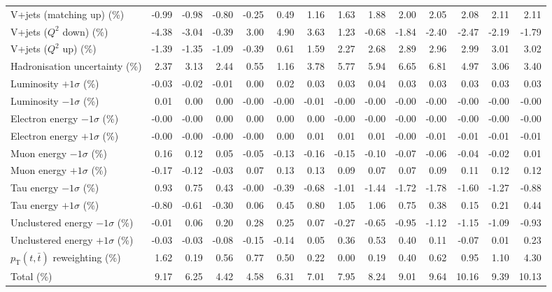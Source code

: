 \begin{table}[htbp]
{\begin{tabular}{lrrrrrrrrrrrrr}
V+jets (matching up) (\%) & -0.99 & -0.98 & -0.80 & -0.25 & 0.49 & 1.16 & 1.63 & 1.88 & 2.00 & 2.05 & 2.08 & 2.11 & 2.11 \\ 
V+jets ($Q^{2}$ down) (\%) & -4.38 & -3.04 & -0.39 & 3.00 & 4.90 & 3.63 & 1.23 & -0.68 & -1.84 & -2.40 & -2.47 & -2.19 & -1.79 \\ 
V+jets ($Q^{2}$ up) (\%) & -1.39 & -1.35 & -1.09 & -0.39 & 0.61 & 1.59 & 2.27 & 2.68 & 2.89 & 2.96 & 2.99 & 3.01 & 3.02 \\ 
Hadronisation uncertainty (\%) & 2.37 & 3.13 & 2.44 & 0.55 & 1.16 & 3.78 & 5.77 & 5.94 & 6.65 & 6.81 & 4.97 & 3.06 & 3.40 \\ 
Luminosity $+1\sigma$ (\%) & -0.03 & -0.02 & -0.01 & 0.00 & 0.02 & 0.03 & 0.03 & 0.04 & 0.03 & 0.03 & 0.03 & 0.03 & 0.03 \\ 
Luminosity $-1\sigma$ (\%) & 0.01 & 0.00 & 0.00 & -0.00 & -0.00 & -0.01 & -0.00 & -0.00 & -0.00 & -0.00 & -0.00 & -0.00 & -0.00 \\ 
Electron energy $-1\sigma$ (\%) & -0.00 & -0.00 & 0.00 & 0.00 & 0.00 & 0.00 & -0.00 & -0.00 & -0.00 & -0.00 & -0.00 & -0.00 & -0.00 \\ 
Electron energy $+1\sigma$ (\%) & -0.00 & -0.00 & -0.00 & -0.00 & 0.00 & 0.01 & 0.01 & 0.01 & -0.00 & -0.01 & -0.01 & -0.01 & -0.01 \\ 
Muon energy $-1\sigma$ (\%) & 0.16 & 0.12 & 0.05 & -0.05 & -0.13 & -0.16 & -0.15 & -0.10 & -0.07 & -0.06 & -0.04 & -0.02 & 0.01 \\ 
Muon energy $+1\sigma$ (\%) & -0.17 & -0.12 & -0.03 & 0.07 & 0.13 & 0.13 & 0.09 & 0.07 & 0.07 & 0.09 & 0.11 & 0.12 & 0.12 \\ 
Tau energy $-1\sigma$ (\%) & 0.93 & 0.75 & 0.43 & -0.00 & -0.39 & -0.68 & -1.01 & -1.44 & -1.72 & -1.78 & -1.60 & -1.27 & -0.88 \\ 
Tau energy $+1\sigma$ (\%) & -0.80 & -0.61 & -0.30 & 0.06 & 0.45 & 0.80 & 1.05 & 1.06 & 0.75 & 0.38 & 0.15 & 0.21 & 0.44 \\ 
Unclustered energy $-1\sigma$ (\%) & -0.01 & 0.06 & 0.20 & 0.28 & 0.25 & 0.07 & -0.27 & -0.65 & -0.95 & -1.12 & -1.15 & -1.09 & -0.93 \\ 
Unclustered energy $+1\sigma$ (\%) & -0.03 & -0.03 & -0.08 & -0.15 & -0.14 & 0.05 & 0.36 & 0.53 & 0.40 & 0.11 & -0.07 & 0.01 & 0.23 \\ 
$p_\mathrm{T}(t,\bar{t})$ reweighting (\%) & 1.62 & 0.19 & 0.56 & 0.77 & 0.50 & 0.22 & 0.00 & 0.19 & 0.40 & 0.62 & 0.95 & 1.10 & 4.30 \\ 
\hline 
Total (\%) & 9.17  & 6.25  & 4.42  & 4.58  & 6.31  & 7.01  & 7.95  & 8.24  & 9.01  & 9.64  & 10.16  & 9.39  & 10.13 \\ 
\hline 
\end{tabular}
}
\end{table}
